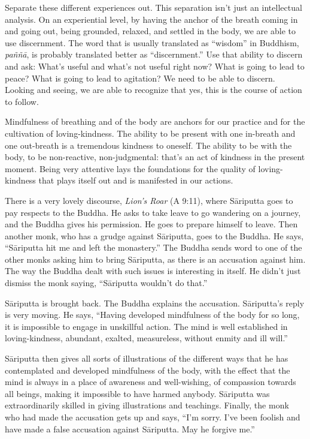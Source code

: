 Separate these different experiences out. This separation isn’t just an
intellectual analysis. On an experiential level, by having the anchor of
the breath coming in and going out, being grounded, relaxed, and settled
in the body, we are able to use discernment. The word that is usually
translated as “wisdom” in Buddhism, \emph{paññā}, is probably translated
better as “discernment.” Use that ability to discern and ask: What’s
useful and what’s not useful right now? What is going to lead to peace?
What is going to lead to agitation? We need to be able to discern.
Looking and seeing, we are able to recognize that yes, this is the
course of action to follow.

Mindfulness of breathing and of the body are anchors for our practice
and for the cultivation of loving-kindness. The ability to be present
with one in-breath and one out-breath is a tremendous kindness to
oneself. The ability to be with the body, to be non-reactive,
non-judgmental: that’s an act of kindness in the present moment. Being
very attentive lays the foundations for the quality of loving-kindness
that plays itself out and is manifested in our actions.

There is a very lovely discourse, \emph{Lion's Roar} (A 9:11), where
Sāriputta goes to pay respects to the Buddha. He asks to take leave to
go wandering on a journey, and the Buddha gives his permission. He goes
to prepare himself to leave. Then another monk, who has a grudge against
Sāriputta, goes to the Buddha. He says, “Sāriputta hit me and left the
monastery.” The Buddha sends word to one of the other monks asking him
to bring Sāriputta, as there is an accusation against him. The way the
Buddha dealt with such issues is interesting in itself. He didn’t just
dismiss the monk saying, “Sāriputta wouldn’t do that.”

Sāriputta is brought back. The Buddha explains the accusation.
Sāriputta’s reply is very moving. He says, “Having developed mindfulness
of the body for so long, it is impossible to engage in unskillful
action. The mind is well established in loving-kindness, abundant,
exalted, measureless, without enmity and ill will.”

Sāriputta then gives all sorts of illustrations of the different ways
that he has contemplated and developed mindfulness of the body, with the
effect that the mind is always in a place of awareness and well-wishing,
of compassion towards all beings, making it impossible to have harmed
anybody. Sāriputta was extraordinarily skilled in giving illustrations
and teachings. Finally, the monk who had made the accusation gets up and
says, “I’m sorry. I’ve been foolish and have made a false accusation
against Sāriputta. May he forgive me.”

